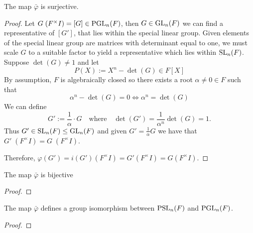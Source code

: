 \begin{lemma}
\label{Surjective_PSL_monoidHom_PGL}
    The map $\bar{\varphi}$ is surjective.
\end{lemma}

\begin{proof}
    Let $G \; (F^\times I) = [G] \in \operatorname{PGL}_n(F)$, then $G \in \operatorname{GL}_n(F)$ we can find a representative of $[G']$, that lies within the special linear group.
    Given elements of the special linear group are matrices with determinant equal to one, we must scale $G$ to a suitable factor to yield a representative which lies within $\operatorname{SL}_n(F)$. Suppose $\det(G) \ne 1$ and let
    \[
    P(X) := X^n - \det(G) \in F[X]
    \]
    By assumption, $F$ is algebraically closed so there exists a root $\alpha \ne 0\in F$ such that 
    \[
    \alpha^n - \det(G) = 0 \iff \alpha^n = \det(G)
    \]
    We can define
    \[
    G' := \frac{1}{\alpha} \cdot G \quad \text{where} \quad \det(G') = \frac{1}{\alpha^n} \det(G) = 1.
    \]
    Thus $G' \in \operatorname{SL}_n(F) \leq \operatorname{GL}_n(F)$ and given $G' = \frac{1}{\alpha} G$ we have that $G'  \; (F^\times I) = G \; (F^\times I)$.
    
    Therefore, $\varphi(G') = i(G') (F^\times I) = G' (F^\times I) = G (F^\times I)$.
\end{proof}

\begin{lemma}
\label{Bijective_PSL_monoidHom_PGL}
    The map $\bar{\varphi}$ is bijective
\end{lemma}

\begin{proof}

\end{proof}

\begin{theorem}
    The map $\bar{\varphi}$ defines a group isomorphism between $\operatorname{PSL}_n(F)$ and $\operatorname{PGL}_n(F)$.
\end{theorem}

\begin{proof}


\end{proof}




